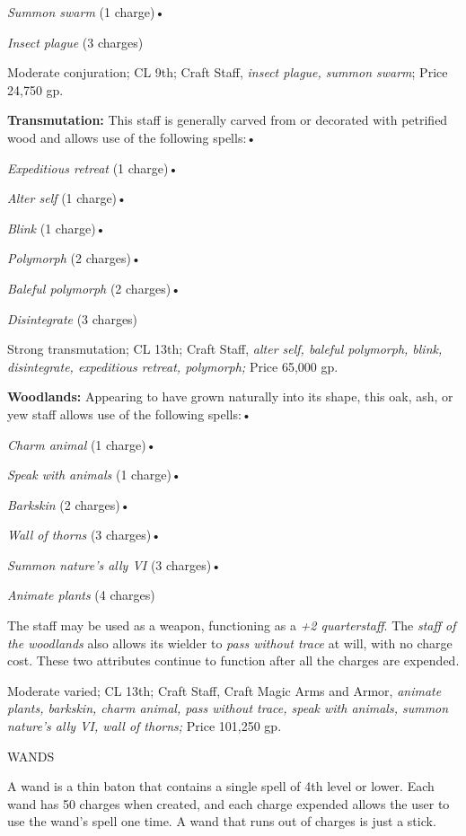 \documentclass{article}
\begin{document}
\textit{Summon swarm }(1 charge)• 

\textit{Insect plague }(3 charges)

Moderate conjuration; CL 9th; Craft Staff, \textit{insect plague, summon swarm}; 
Price 24,750 gp.

\textbf{Transmutation:} This staff is generally carved from or decorated with petrified 
wood and allows use of the following spells:• 

\textit{Expeditious retreat }(1 charge)• 

\textit{Alter self }(1 charge)• 

\textit{Blink }(1 charge)• 

\textit{Polymorph }(2 charges)• 

\textit{Baleful polymorph }(2 charges)• 

\textit{Disintegrate }(3 charges)

Strong transmutation; CL 13th; Craft Staff, \textit{alter self, baleful polymorph, 
blink, disintegrate, expeditious retreat, polymorph; }Price 65,000 gp.

\textbf{Woodlands:} Appearing to have grown naturally into its shape, this oak, 
ash, or yew staff allows use of the following spells:• 

\textit{Charm animal }(1 charge)• 

\textit{Speak with animals }(1 charge)• 

\textit{Barkskin }(2 charges)• 

\textit{Wall of thorns }(3 charges)• 

\textit{Summon nature's ally VI }(3 charges)• 

\textit{Animate plants }(4 charges)

The staff may be used as a weapon, functioning as a \textit{+2 quarterstaff}. The 
\textit{staff of the woodlands }also allows its wielder to \textit{pass without 
trace }at will, with no charge cost. These two attributes continue to function 
after all the charges are expended.

Moderate varied; CL 13th; Craft Staff, Craft Magic Arms and Armor, \textit{animate 
plants, barkskin, charm animal, pass without trace, speak with animals, summon 
nature's ally VI, wall of thorns; }Price 101,250 gp.

\vspace{12pt}
WANDS

A wand is a thin baton that contains a single spell of 4th level or lower. Each 
wand has 50 charges when created, and each charge expended allows the user to use 
the wand's spell one time. A wand that runs out of charges is just a stick.
\end{document}
